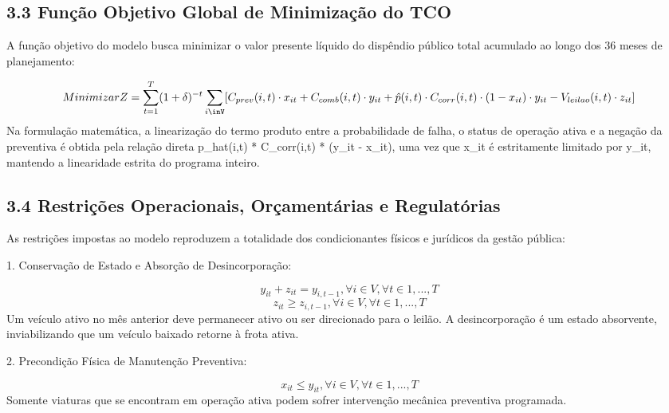 \documentclass[10pt,a4paper,journal]{article}
\begin{document}
\subsection{3.3 Função Objetivo Global de Minimização do TCO}
A função objetivo do modelo busca minimizar o valor presente líquido do dispêndio público total acumulado ao longo dos 36 meses de planejamento:

\begin{equation}
Minimizar Z = \sum_{t=1}^{T} (1 + \delta)^{-t} \sum_{i\inV} [ C_{prev}(i, t) \cdot x_{it} + C_{comb}(i, t) \cdot y_{it} + \hat{p}(i, t) \cdot C_{corr}(i, t) \cdot (1 - x_{it}) \cdot y_{it} - V_{leilao}(i, t) \cdot z_{it} ] \label{eq:1}
\end{equation}
Na formulação matemática, a linearização do termo produto entre a probabilidade de falha, o status de operação ativa e a negação da preventiva é obtida pela relação direta p\_hat(i,t) * C\_corr(i,t) * (y\_it - x\_it), uma vez que x\_it é estritamente limitado por y\_it, mantendo a linearidade estrita do programa inteiro.

\subsection{3.4 Restrições Operacionais, Orçamentárias e Regulatórias}
As restrições impostas ao modelo reproduzem a totalidade dos condicionantes físicos e jurídicos da gestão pública:

1. Conservação de Estado e Absorção de Desincorporação:

\begin{equation}
y_{it} + z_{it} = y_{i,t-1}, \forall i \in V, \forall t \in {1, ..., T} \label{eq:2}
\end{equation}
\begin{equation}
z_{it} \ge z_{i,t-1}, \forall i \in V, \forall t \in {1, ..., T} \label{eq:3}
\end{equation}
Um veículo ativo no mês anterior deve permanecer ativo ou ser direcionado para o leilão. A desincorporação é um estado absorvente, inviabilizando que um veículo baixado retorne à frota ativa.

2. Precondição Física de Manutenção Preventiva:

\begin{equation}
x_{it} \le y_{it}, \forall i \in V, \forall t \in {1, ..., T} \label{eq:4}
\end{equation}
Somente viaturas que se encontram em operação ativa podem sofrer intervenção mecânica preventiva programada.
\end{document}
